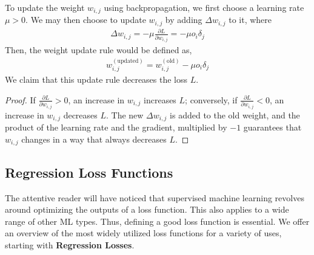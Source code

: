 \documentclass[nobib]{tufte-handout} %
\begin{document}
  To update the weight $w_{i,j}$ using backpropagation, we first choose a learning rate $\mu> 0$. We may then choose to update $w_{i,j}$ by adding $\Delta w_{i,j}$ to it, where
  \begin{equation*}
    \begin{split}
      \Delta w_{i,j} = -\mu \frac{\partial {L}}{\partial {w_{i,j}}}  = - \mu  o_i \delta_j
    \end{split}
  \end{equation*}
 Then, the weight update rule would be defined as, 
 \begin{equation*}
  \begin{split}
    w_{i,j}^{(\text{updated})} =  w_{i,j}^{(\text{old})} - \mu  o_i \delta_j
  \end{split}
 \end{equation*}
 We claim that this update rule decreases the loss $L$. 
 \begin{proof} 
  
If ${\frac {\partial L}{\partial w_{i,j}}}>0$, an increase in $w_{i,j}$ increases $L$; conversely, if $\frac {\partial L}{\partial w_{i,j}}<0$, an increase in $w_{i,j}$ decreases $L$. The new $\Delta w_{i,j}$ is added to the old weight, and the product of the learning rate and the gradient, multiplied by $-1$ guarantees that $w_{i,j}$  changes in a way that always decreases $L$. 
 \end{proof}

\subsection{Regression Loss Functions}%
  \label{sub:Loss Function}
  The attentive reader will have noticed that supervised machine learning revolves around optimizing the outputs of a loss function. This also applies to a wide range of other ML types. Thus, defining a good loss function is essential. We offer an overview of the most widely utilized loss functions for a variety of uses, starting with \textbf{Regression Losses}.
\end{document}
